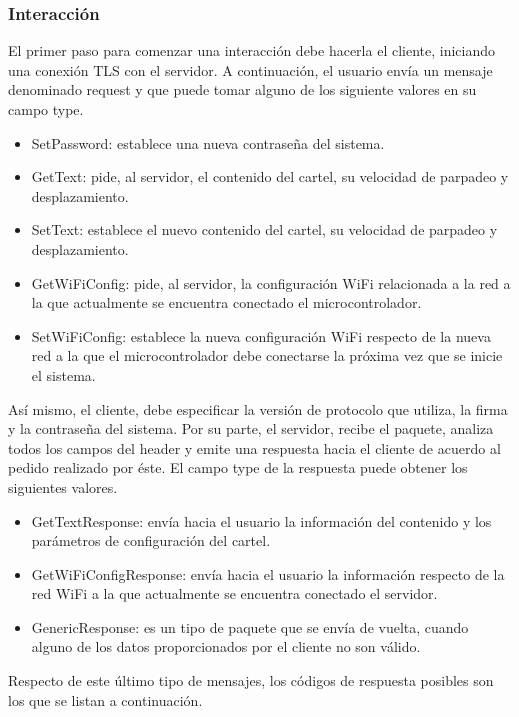 \subsubsection{Interacción}

El primer paso para comenzar una interacción debe hacerla el cliente, iniciando una conexión TLS con el servidor.
A continuación, el usuario envía un mensaje denominado request y que puede tomar alguno de los siguiente valores en su campo type.

\begin{itemize}
	\item SetPassword: establece una nueva contraseña del sistema.
	\item GetText: pide, al servidor, el contenido del cartel, su velocidad de parpadeo y desplazamiento.
	\item SetText: establece el nuevo contenido del cartel, su velocidad de parpadeo y desplazamiento.
	\item GetWiFiConfig: pide, al servidor, la configuración WiFi relacionada a la red a la que actualmente se encuentra conectado el microcontrolador.
	\item SetWiFiConfig: establece la nueva configuración WiFi respecto de la nueva red a la que el microcontrolador debe conectarse la próxima vez que se inicie el sistema.
\end{itemize}

Así mismo, el cliente, debe especificar la versión de protocolo que utiliza, la firma y la contraseña del sistema.
Por su parte, el servidor, recibe el paquete, analiza todos los campos del header y emite una respuesta hacia el cliente de acuerdo al pedido realizado por éste.
El campo type de la respuesta puede obtener los siguientes valores.

\begin{itemize}
	\item GetTextResponse: envía hacia el usuario la información del contenido y los parámetros de configuración del cartel.
	\item GetWiFiConfigResponse: envía hacia el usuario la información respecto de la red WiFi a la que actualmente se encuentra conectado el servidor.
	\item GenericResponse: es un tipo de paquete que se envía de vuelta, cuando alguno de los datos proporcionados por el cliente no son válido.
\end{itemize}

Respecto de este último tipo de mensajes, los códigos de respuesta posibles son los que se listan a continuación.


